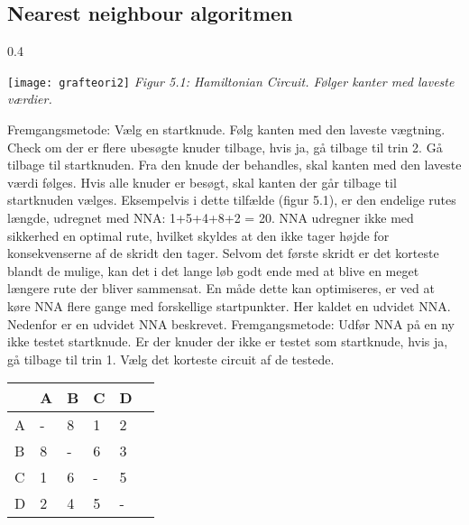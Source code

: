 \subsection{Nearest neighbour algoritmen}
\begin{wrapfigure}{}{0.4\textwidth}
	\vspace{70pt}
	\begin{center}
		\texttt{[image: grafteori2]} \newline
		\textit{ Figur 5.1: Hamiltonian Circuit. \newline Følger kanter med laveste værdier.}
	\end{center}
	\vspace{-10pt}
\end{wrapfigure}
Fremgangsmetode: \newline
Vælg en startknude. \newline
Følg kanten med den laveste vægtning. \newline
Check om der er flere ubesøgte knuder tilbage, hvis ja, gå tilbage til trin 2. \newline
Gå tilbage til startknuden. \newline
Fra den knude der behandles, skal kanten med den laveste værdi følges. Hvis alle knuder er besøgt, skal kanten der går tilbage til startknuden vælges. \newline
Eksempelvis i dette tilfælde (figur 5.1),  er den endelige rutes længde, udregnet med NNA: 1+5+4+8+2 = 20. \newline
NNA udregner ikke med sikkerhed en optimal rute, hvilket skyldes at den ikke tager højde for konsekvenserne af de skridt den tager. Selvom det første skridt er det korteste blandt de mulige, kan det i det lange løb godt ende med at blive en meget længere rute der bliver sammensat. En måde dette kan optimiseres, er ved at køre NNA flere gange med forskellige startpunkter. Her kaldet en udvidet NNA. Nedenfor er en udvidet NNA beskrevet. \newline
Fremgangsmetode: \newline
Udfør NNA på en ny ikke testet startknude. \newline
Er der knuder der ikke er testet som startknude, hvis ja, gå tilbage til trin 1. \newline
Vælg det korteste circuit af de testede. \newline


\begin{tabular}{| l | l | l | l | l | l |}
	\hline
	& A & B & C & D  \\ \hline
	A & - & 8 & 1 & 2 \\ \hline
	B & 8 & - & 6 & 3  \\ \hline
	C & 1 & 6 & - & 5  \\ \hline
	D & 2 & 4 & 5 & -  \\ \hline
	\hline
\end{tabular}\newline

